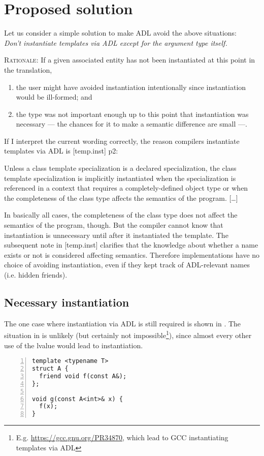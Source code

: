 
\section{Proposed solution}

Let us consider a simple solution to make ADL avoid the above situations:\\
\emph{Don't instantiate templates via ADL except for the argument type itself.}

\textsc{Rationale:} If a given associated entity has not been instantiated at this point 
in the translation,
\begin{enumerate}
\item the user might have avoided instantiation intentionally since instantiation would be 
ill-formed; and
\item the type was not important enough up to this point that instantiation was necessary 
--- the chances for it to make a semantic difference are small ---.
\end{enumerate}

If I interpret the current wording correctly, the reason compilers instantiate templates 
via ADL is [temp.inst] p2:
\begin{wgText}

\setcounter{Paras}{1}
\pnum Unless a class template specialization is a declared specialization, the class 
template specialization is implicitly instantiated when the specialization is referenced 
in a context that requires a completely-defined object type or when the completeness of 
the class type affects the semantics of the program. [\ldots]

\end{wgText}
In basically all cases, the completeness of the class type does not affect the semantics 
of the program, though. But the compiler cannot know that instantiation is unnecessary 
until after it instantiated the template. The subsequent note in [temp.inst] clarifies 
that the knowledge about whether a name exists or not is considered affecting semantics. 
Therefore implementations have no choice of avoiding instantiation, even if they kept 
track of ADL-relevant names (i.e. hidden friends).


\subsection{Necessary instantiation}

The one case where instantiation via ADL is still required is shown in 
. The situation in  is unlikely (but 
certainly not impossible\footnote{E.g. \url{https://gcc.gnu.org/PR34870}, which lead to 
GCC instantiating templates via ADL}), since almost every other use of the lvalue  
would lead to instantiation.
\begin{lstlisting}[style=Vc,numbers=left,float={hbtp},label=lst:needsInstantiation,caption={
Requires instantiation or reasonable code could break.
}]
template <typename T>
struct A {
  friend void f(const A&);
};

void g(const A<int>& x) {
  f(x);
}
\end{lstlisting}

